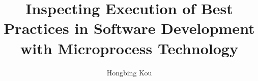 \documentclass[11pt,proposal,times,thesis,actual]{uhthesis2e}
\begin{document}
\title{Inspecting Execution of Best Practices in Software Development with Microprocess Technology}
\author{Hongbing Kou}


\othermembers{}
\maketitle
\thispagestyle{empty}




\tableofcontents











\end{document}
